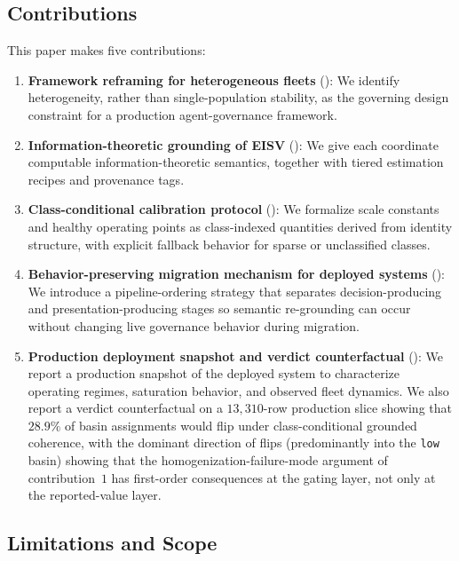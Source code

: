 \documentclass[11pt,twocolumn]{article}
\begin{document}
\subsection{Contributions}

This paper makes five contributions:

\begin{enumerate}
\item \textbf{Framework reframing for heterogeneous fleets}
  (): We identify heterogeneity, rather than
  single-population stability, as the governing design constraint for a
  production agent-governance framework.

\item \textbf{Information-theoretic grounding of EISV}
  (): We give each coordinate computable
  information-theoretic semantics, together with tiered estimation
  recipes and provenance tags.

\item \textbf{Class-conditional calibration protocol}
  (): We formalize scale constants and
  healthy operating points as class-indexed quantities derived from
  identity structure, with explicit fallback behavior for sparse or
  unclassified classes.

\item \textbf{Behavior-preserving migration mechanism for deployed systems}
  (): We introduce a pipeline-ordering strategy
  that separates decision-producing and presentation-producing stages so
  semantic re-grounding can occur without changing live governance
  behavior during migration.

\item \textbf{Production deployment snapshot and verdict counterfactual}
  (): We report a production snapshot of the
  deployed system to characterize operating regimes, saturation
  behavior, and observed fleet dynamics. We also report a verdict
  counterfactual on a $13{,}310$-row production slice showing that
  $28.9\%$ of basin assignments would flip under class-conditional
  grounded coherence, with the dominant direction of flips
  (predominantly into the \texttt{low} basin) showing that the
  homogenization-failure-mode argument of contribution~$1$ has
  first-order consequences at the gating layer, not only at the
  reported-value layer.
\end{enumerate}

\subsection{Limitations and Scope}
\label{sec:limitations-and-scope}
\end{document}

